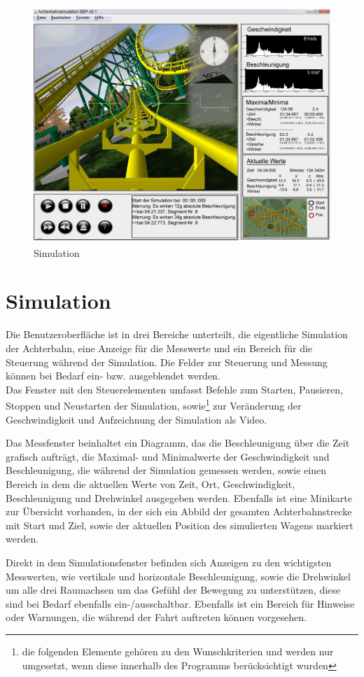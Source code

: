 \begin{figure}[!h]%
\includegraphics[width=0.8\linewidth]{./bilder/GUI_v2.jpg}%
\caption{Simulation}%
\label{Simulation}%
\end{figure}
\section*{Simulation}

Die Benutzeroberfläche ist in drei Bereiche unterteilt, die eigentliche Simulation der Achterbahn, eine Anzeige für die Messwerte und ein Bereich für die Steuerung während der Simulation. Die Felder zur Steuerung und Messung können bei Bedarf ein- bzw. ausgeblendet werden.\\
Das Fenster mit den Steuerelementen umfasst Befehle zum Starten, Pausieren, Stoppen und Neustarten der Simulation, sowie\footnote{die folgenden Elemente gehören zu den Wunschkriterien und werden nur umgesetzt, wenn diese innerhalb des Programms berücksichtigt wurden} zur Veränderung der Geschwindigkeit und Aufzeichnung der Simulation als Video.

Das Messfenster beinhaltet ein Diagramm, das die Beschleunigung über die Zeit grafisch aufträgt, die Maximal- und Minimalwerte der Geschwindigkeit und Beschleunigung, die während der Simulation gemessen werden, sowie einen Bereich in dem die aktuellen Werte von Zeit, Ort, Geschwindigkeit, Beschleunigung und Drehwinkel ausgegeben werden.
Ebenfalls ist eine Minikarte zur Übersicht vorhanden, in der sich ein Abbild der gesamten Achterbahnstrecke mit Start und Ziel, sowie der aktuellen Position des simulierten Wagens markiert werden.

Direkt in dem Simulationsfenster befinden sich Anzeigen zu den wichtigsten Messwerten, wie vertikale und horizontale Beschleunigung, sowie die Drehwinkel um alle drei Raumachsen um das Gefühl der Bewegung zu unterstützen, diese sind bei Bedarf ebenfalls ein-/ausschaltbar. Ebenfalls ist ein Bereich für Hinweise oder Warnungen, die während der Fahrt auftreten können vorgesehen. 


